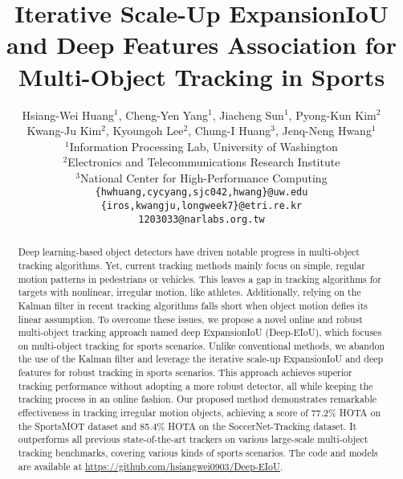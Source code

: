 \documentclass[10pt,twocolumn,letterpaper]{article}
\begin{document}
\title{Iterative Scale-Up ExpansionIoU and Deep Features Association for Multi-Object Tracking in Sports}

\author{Hsiang-Wei Huang$^{1}$, Cheng-Yen Yang$^{1}$, Jiacheng Sun$^{1}$, Pyong-Kun Kim$^{2}$\\Kwang-Ju Kim$^{2}$, Kyoungoh Lee$^{2}$, Chung-I Huang$^{3}$, Jenq-Neng Hwang$^{1}$\\
$^{1}$Information Processing Lab, University of Washington\\
$^{2}$Electronics and Telecommunications Research Institute\\
$^{3}$National Center for High-Performance Computing\\
{\tt\small \{hwhuang,cycyang,sjc042,hwang\}@uw.edu}\\
{\tt\small \{iros,kwangju,longweek7\}@etri.re.kr}\\
\tt\small 1203033@narlabs.org.tw}


\maketitle
\thispagestyle{empty}

\begin{abstract}
Deep learning-based object detectors have driven notable progress in multi-object tracking algorithms. Yet, current tracking methods mainly focus on simple, regular motion patterns in pedestrians or vehicles. This leaves a gap in tracking algorithms for targets with nonlinear, irregular motion, like athletes. Additionally, relying on the Kalman filter in recent tracking algorithms falls short when object motion defies its linear assumption. To overcome these issues, we propose a novel online and robust multi-object tracking approach named deep ExpansionIoU (Deep-EIoU), which focuses on multi-object tracking for sports scenarios. Unlike conventional methods, we abandon the use of the Kalman filter and leverage the iterative scale-up ExpansionIoU and deep features for robust tracking in sports scenarios. This approach achieves superior tracking performance without adopting a more robust detector, all while keeping the tracking process in an online fashion. Our proposed method demonstrates remarkable effectiveness in tracking irregular motion objects, achieving a score of 77.2\% HOTA on the SportsMOT dataset and 85.4\% HOTA on the SoccerNet-Tracking dataset. It outperforms all previous state-of-the-art trackers on various large-scale multi-object tracking benchmarks, covering various kinds of sports scenarios. The code and models are available at \href{https://github.com/hsiangwei0903/Deep-EIoU}{https://github.com/hsiangwei0903/Deep-EIoU}.
\end{abstract}
\end{document}
